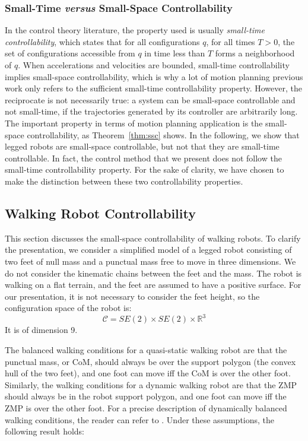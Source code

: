 \documentclass{article}
\begin{document}
\subsubsection{Small-Time \textit{versus} Small-Space Controllability}
In the control theory literature, the property used is usually \textit{small-time controllability}, 
which states that for  all configurations  $q$, for  all times
$T>0$, the set of configurations accessible from $q$ in time less than
$T$ forms a  neighborhood of $q$. When accelerations and velocities are bounded,
small-time controllability implies small-space controllability, which is why 
a lot of motion planning previous work only refers to the sufficient small-time controllability
property. However, the reciprocate is not necessarily true:  a system can be 
small-space controllable and
not small-time, if the trajectories generated by its controller are arbitrarily long.
The important property
in terms of motion planning application is the small-space controllability, as 
Theorem~\ref{thm:ssc} shows. In the following, we show that legged robots
are small-space controllable, but  not that they are small-time controllable.
In fact, the  control method that we present does not follow the small-time controllability
property. For the sake of clarity, we have chosen to make the distinction between these
two controllability properties.



\subsection{Walking Robot Controllability}
\label{sec:humanoid-ssc}

This section  discusses the small-space controllability of walking robots. To clarify
the presentation, we consider a simplified model of a legged robot consisting of two feet
of null mass and a punctual mass free to move in three dimensions.
We do not consider 
the kinematic chains between the feet and the mass. The robot is walking on a flat terrain,
and the feet are assumed to have a positive surface. For our presentation, it is not 
necessary to consider the feet height, so the configuration space of the robot is:
\[
\mathcal{C} = SE(2) \times SE(2) \times \mathbb{R}^3
\]
It is of dimension 9.


The balanced walking conditions for a quasi-static walking robot are that the punctual
mass, or CoM, should always be over the support polygon (the convex hull of the two feet), and 
one foot can move iff the CoM is over the other foot. Similarly, the walking
conditions for a dynamic walking robot are that the ZMP should
always be in the robot support polygon, and one foot can move iff the ZMP is over the other 
foot. For a precise description of dynamically balanced walking conditions, the reader can refer
to \cite{wieber2002}. Under these assumptions, the following result holds:
\end{document}
